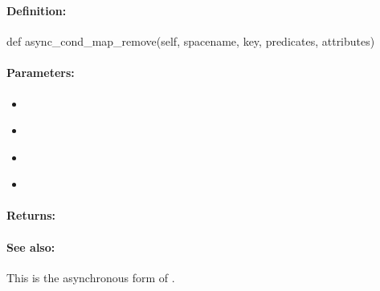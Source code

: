 \pagebreak
\subsubsection{}
\label{api:python:async_cond_map_remove}


\paragraph{Definition:}
\begin{pythoncode}
def async_cond_map_remove(self, spacename, key, predicates, attributes)
\end{pythoncode}

\paragraph{Parameters:}
\begin{itemize}[noitemsep]
\item {}\\

\item {}\\

\item {}\\

\item {}\\

\end{itemize}

\paragraph{Returns:}


\paragraph{See also:}  This is the asynchronous form of .

\pagebreak
\subsubsection{}
\label{api:python:document_rename}


